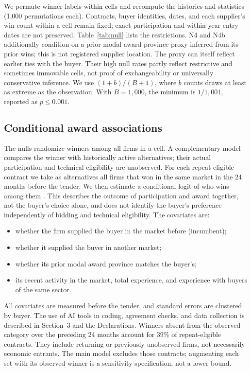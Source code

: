 \documentclass[pdflatex,sn-apa]{sn-jnl}
\begin{document}
We permute winner labels within cells and recompute the histories and statistics (1,000 permutations each). Contracts, buyer identities, dates, and each supplier's win count within a cell remain fixed; exact participation and within-year entry dates are not preserved. Table~\ref{tab:null} lists the restrictions. N4 and N4b additionally condition on a prior modal award-province proxy inferred from its prior wins; this is not registered supplier location. The proxy can itself reflect earlier ties with the buyer. Their high null rates partly reflect restrictive and sometimes immovable cells, not proof of exchangeability or universally conservative inference. We use $(1+b)/(B+1)$, where $b$ counts draws at least as extreme as the observation. With $B=1{,}000$, the minimum is $1/1{,}001$, reported as $p\leq0.001$.

\subsection{Conditional award associations}
The nulls randomize winners among all firms in a cell. A complementary model compares the winner with historically active alternatives; their actual participation and technical eligibility are unobserved. For each repeat-eligible contract we take as alternatives all firms that won in the same market in the 24 months before the tender. We then estimate a conditional logit of who wins among them \citep{McFadden1974,McFadden1978}. This describes the outcome of participation and award together, not the buyer's choice alone, and does not identify the buyer's preference independently of bidding and technical eligibility. The covariates are:
\begin{itemize}
\item whether the firm supplied the buyer in the market before (incumbent);
\item whether it supplied the buyer in another market;
\item whether its prior modal award province matches the buyer's;
\item its recent activity in the market, total experience, and experience with buyers of the same sector.
\end{itemize}
All covariates are measured before the tender, and standard errors are clustered by buyer. The use of AI tools in coding, agreement checks, and data collection is described in Section~3 and the Declarations. Winners absent from the observed category over the preceding 24 months account for 39\% of repeat-eligible contracts. They include returning or previously unobserved firms, not necessarily economic entrants. The main model excludes those contracts; augmenting each set with its observed winner is a sensitivity specification, not a lower bound.
\end{document}
